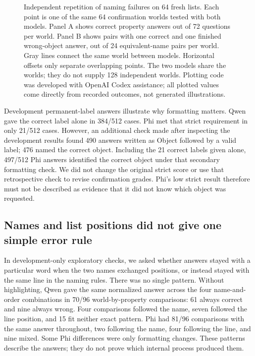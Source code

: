 \documentclass[10pt,letterpaper]{article}
\begin{document}
\begin{figure}[!h]\caption{Independent repetition of naming failures on 64 fresh lists. Each point is one of the same 64 confirmation worlds tested with both models. Panel A shows correct property answers out of 72 questions per world. Panel B shows pairs with one correct and one finished wrong-object answer, out of 24 equivalent-name pairs per world. Gray lines connect the same world between models. Horizontal offsets only separate overlapping points. The two models share the worlds; they do not supply 128 independent worlds. Plotting code was developed with OpenAI Codex assistance; all plotted values come directly from recorded outcomes, not generated illustrations.}\label{fig1}\end{figure}

Development permanent-label answers illustrate why formatting matters. Qwen gave the correct label alone in 384/512 cases. Phi met that strict requirement in only 21/512 cases. However, an additional check made after inspecting the development results found 490 answers written as Object followed by a valid label; 476 named the correct object. Including the 21 correct labels given alone, 497/512 Phi answers identified the correct object under that secondary formatting check. We did not change the original strict score or use that retrospective check to revise confirmation grades. Phi's low strict result therefore must not be described as evidence that it did not know which object was requested.


\subsection*{Names and list positions did not give one simple error rule}

In development-only exploratory checks, we asked whether answers stayed with a particular word when the two names exchanged positions, or instead stayed with the same line in the naming rules. There was no single pattern. Without highlighting, Qwen gave the same normalized answer across the four name-and-order combinations in 70/96 world-by-property comparisons: 61 always correct and nine always wrong. Four comparisons followed the name, seven followed the line position, and 15 fit neither exact pattern. Phi had 81/96 comparisons with the same answer throughout, two following the name, four following the line, and nine mixed. Some Phi differences were only formatting changes. These patterns describe the answers; they do not prove which internal process produced them.
\end{document}
